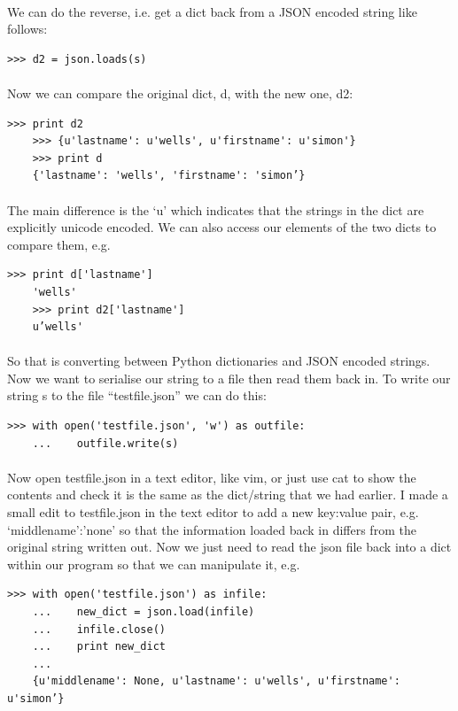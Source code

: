 \documentclass[12pt, a4paper, oneside]{book}
\begin{document}
\paragraph{} We can do the reverse, i.e. get a dict back from a JSON encoded string like follows:
\begin{lstlisting}[style=DOS]
    >>> d2 = json.loads(s)
\end{lstlisting}

\paragraph{} Now we can compare the original dict, d, with the new one, d2:
\begin{lstlisting}[style=DOS]
    >>> print d2
    >>> {u'lastname': u'wells', u'firstname': u'simon'}
    >>> print d
    {'lastname': 'wells', 'firstname': 'simon’}
\end{lstlisting}

\paragraph{} The main difference is the ‘u’ which indicates that the strings in the dict are explicitly unicode encoded. We can also access our elements of  the two dicts to compare them, e.g.
\begin{lstlisting}[style=DOS]
    >>> print d['lastname']
    'wells'
    >>> print d2['lastname']
    u’wells'
\end{lstlisting}

\paragraph{} So that is converting between Python dictionaries and JSON encoded strings. Now we want to serialise our string to a file then read them back in. To write our string s to the file “testfile.json” we can do this:
\begin{lstlisting}[style=DOS]
    >>> with open('testfile.json', 'w') as outfile:
    ...    outfile.write(s)
\end{lstlisting}

\paragraph{} Now open testfile.json in a text editor, like vim, or just use cat to show the contents and check it is the same as the dict/string that we had earlier. I made a small edit to testfile.json in the text editor to add a new key:value pair, e.g. ‘middlename':’none’ so that the information loaded back in differs from the original string written out. Now we just need to read the json file back into a dict within our program so that we can manipulate it, e.g.
\begin{lstlisting}[style=DOS]
    >>> with open('testfile.json') as infile:
    ...    new_dict = json.load(infile)
    ...    infile.close()
    ...    print new_dict
    ... 
    {u'middlename': None, u'lastname': u'wells', u'firstname': u'simon’}
\end{lstlisting}
\end{document}
